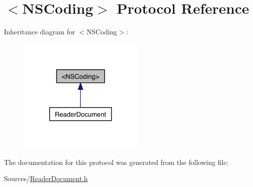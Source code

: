 \hypertarget{class_n_s_coding-p}{\section{$<$N\-S\-Coding$>$ Protocol Reference}
\label{d7/dc8/class_n_s_coding-p}
}


Inheritance diagram for $<$N\-S\-Coding$>$\-:
\nopagebreak
\begin{figure}[H]
\begin{center}
\leavevmode
\includegraphics[width=174pt]{d1/d11/class_n_s_coding-p__inherit__graph}
\end{center}
\end{figure}


The documentation for this protocol was generated from the following file\-:\begin{DoxyCompactItemize}
\item 
Sources/\hyperlink{_reader_document_8h}{Reader\-Document.\-h}\end{DoxyCompactItemize}

